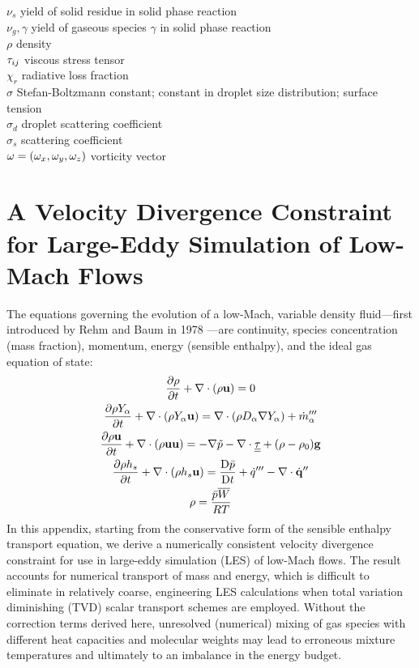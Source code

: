 \begin{tabbing}
$\nu_s$                   \> yield of solid residue in solid phase reaction \\
$\nu_g,\gamma$            \> yield of gaseous species $\gamma$ in solid phase reaction \\
$\rho$                    \> density \\
${\bf \tau}_{ij}$              \> viscous stress tensor \\
$\chi_r$                  \> radiative loss fraction \\
$\sigma$                  \> Stefan-Boltzmann constant; constant in droplet size distribution; surface tension \\
$\sigma_d$                \> droplet scattering coefficient \\
$\sigma_s$                \> scattering coefficient \\
${\bf \omega}=(\omega_x,\omega_y,\omega_z)$    \> vorticity vector \\
\end{tabbing}





\chapter{A Velocity Divergence Constraint for Large-Eddy Simulation of Low-Mach Flows}
\label{app_divergence}

The equations governing the evolution of a low-Mach, variable density fluid---first introduced by Rehm and Baum in 1978 \cite{Rehm:1}---are continuity, species concentration (mass fraction), momentum, energy (sensible enthalpy), and the ideal gas equation of state:
\begin{gather}
\label{eqn_rho} \frac{\partial \rho}{\partial t} + \nabla\cdot(\rho\mathbf{u}) = 0 \\
\label{eqn_Y_a} \frac{\partial \rho Y_\alpha}{\partial t} + \nabla\cdot(\rho Y_\alpha \mathbf{u}) = \nabla\cdot (\rho D_\alpha \nabla Y_\alpha) + \dot{m}_\alpha^{\prime\prime\prime} \\
\label{eqn_u}   \frac{\partial \rho \mathbf{u}}{\partial t} + \nabla\cdot(\rho \mathbf{u} \mathbf{u}) = -\nabla \tilde{p} - \nabla\cdot\underline{\underline{\tau}} + (\rho-\rho_0) \mathbf{g} \\
\label{eqn_h_s} \frac{\partial \rho h_s}{\partial t} + \nabla\cdot(\rho h_s \mathbf{u}) = \frac{\mbox{D} \bar{p}}{\mbox{D} t} + \dot{q}^{\prime\prime\prime} - \nabla\cdot \dot{\mathbf{q}}^{\prime\prime} \\
\label{eqn_eos} \rho = \frac{\bar{p} \overline{W}}{RT}
\end{gather}
In this appendix, starting from the conservative form of the sensible enthalpy transport equation, we derive a numerically consistent velocity divergence constraint for use in large-eddy simulation (LES) of low-Mach flows.  The result accounts for numerical transport of mass and energy, which is difficult to eliminate in relatively coarse, engineering LES calculations when total variation diminishing (TVD) scalar transport schemes are employed.  Without the correction terms derived here, unresolved (numerical) mixing of gas species with different heat capacities and molecular weights may lead to erroneous mixture temperatures and ultimately to an imbalance in the energy budget.

